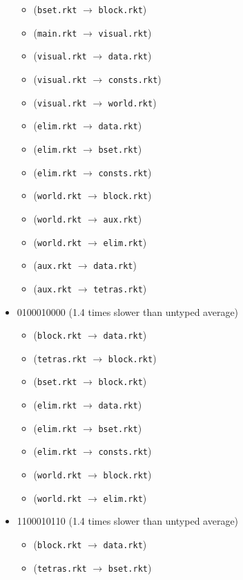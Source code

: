 \documentclass{article}
\newcommand{\mono}[1]{\texttt{#1}}
\begin{document}
\begin{itemize}
\begin{itemize}
  \item (\mono{bset.rkt} $\rightarrow$ \mono{block.rkt})
  \item (\mono{main.rkt} $\rightarrow$ \mono{visual.rkt})
  \item (\mono{visual.rkt} $\rightarrow$ \mono{data.rkt})
  \item (\mono{visual.rkt} $\rightarrow$ \mono{consts.rkt})
  \item (\mono{visual.rkt} $\rightarrow$ \mono{world.rkt})
  \item (\mono{elim.rkt} $\rightarrow$ \mono{data.rkt})
  \item (\mono{elim.rkt} $\rightarrow$ \mono{bset.rkt})
  \item (\mono{elim.rkt} $\rightarrow$ \mono{consts.rkt})
  \item (\mono{world.rkt} $\rightarrow$ \mono{block.rkt})
  \item (\mono{world.rkt} $\rightarrow$ \mono{aux.rkt})
  \item (\mono{world.rkt} $\rightarrow$ \mono{elim.rkt})
  \item (\mono{aux.rkt} $\rightarrow$ \mono{data.rkt})
  \item (\mono{aux.rkt} $\rightarrow$ \mono{tetras.rkt})
  \end{itemize}
\item 0100010000 (1.4 times slower than untyped average)
  \begin{itemize}
  \item (\mono{block.rkt} $\rightarrow$ \mono{data.rkt})
  \item (\mono{tetras.rkt} $\rightarrow$ \mono{block.rkt})
  \item (\mono{bset.rkt} $\rightarrow$ \mono{block.rkt})
  \item (\mono{elim.rkt} $\rightarrow$ \mono{data.rkt})
  \item (\mono{elim.rkt} $\rightarrow$ \mono{bset.rkt})
  \item (\mono{elim.rkt} $\rightarrow$ \mono{consts.rkt})
  \item (\mono{world.rkt} $\rightarrow$ \mono{block.rkt})
  \item (\mono{world.rkt} $\rightarrow$ \mono{elim.rkt})
  \end{itemize}
\item 1100010110 (1.4 times slower than untyped average)
  \begin{itemize}
  \item (\mono{block.rkt} $\rightarrow$ \mono{data.rkt})
  \item (\mono{tetras.rkt} $\rightarrow$ \mono{bset.rkt})

\end{itemize}
\end{itemize}
\end{document}
